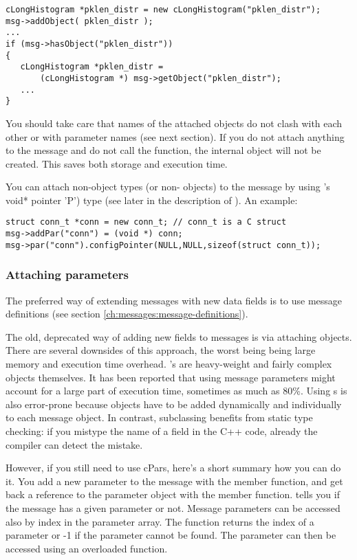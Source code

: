 \begin{verbatim}
cLongHistogram *pklen_distr = new cLongHistogram("pklen_distr");
msg->addObject( pklen_distr );
...
if (msg->hasObject("pklen_distr"))
{
   cLongHistogram *pklen_distr =
       (cLongHistogram *) msg->getObject("pklen_distr");
   ...
}
\end{verbatim}

You should take care that names of the attached objects do not
clash with each other or with  parameter names
(see next section).
If you do not attach anything to the message and do not call the
 function, the internal  object
will not be created.
This saves both storage and execution time.

You can attach non-object types (or non- objects) to
the message by using
's void* pointer 'P') type (see later in the description
of ). An example:

\begin{verbatim}
struct conn_t *conn = new conn_t; // conn_t is a C struct
msg->addPar("conn") = (void *) conn;
msg->par("conn").configPointer(NULL,NULL,sizeof(struct conn_t));
\end{verbatim}




\subsubsection{Attaching parameters}

The preferred way of extending messages with new data fields is to use
message definitions (see section \ref{ch:messages:message-definitions}).

The old, deprecated way of adding new fields to messages is via
attaching  objects.
There are several downsides of this approach, the worst being
being large memory and execution time overhead. 's are
heavy-weight and fairly complex objects themselves.
It has been reported that using  message parameters
might account for a large part of execution time, sometimes as much as 80\%.
Using s is also error-prone because  objects
have to be added dynamically and individually to each message object.
In contrast, subclassing benefits from static type checking:
if you mistype the name of a field in the C++ code, already the compiler
can detect the mistake.


However, if you still need to use cPars, here's a short summary
how you can do it. You add a new parameter to the message with the
 member function, and get back a reference
to the parameter object with the  member function.
 tells you if the message has a
given parameter or not.
Message parameters can be accessed also by index in the parameter
array. The  function returns the index of a parameter
or -1 if the parameter cannot be found. The parameter can then be
accessed using an overloaded  function.

